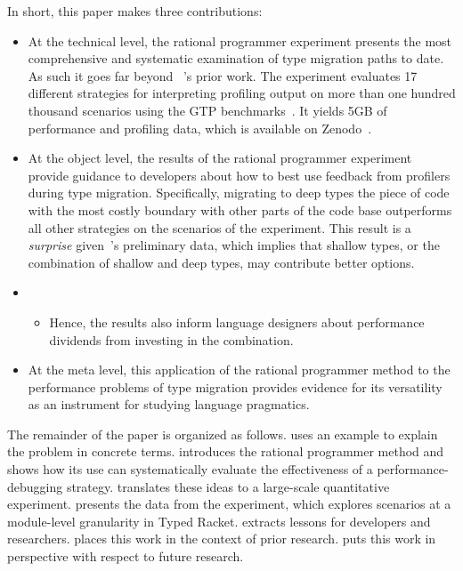 In short, this paper makes three contributions:
\begin{itemize}

\item At the technical level, the rational programmer experiment presents
  the most comprehensive and systematic examination of type migration
    paths to date.    As such it goes far beyond ~\citet{g-deep-shallow}'s 
    prior work.  The experiment evaluates 17 different strategies for
    interpreting profiling output on  more than one hundred thousand scenarios using the GTP
    benchmarks~\cite{g-rep-2023}. It yields
     5GB of performance and profiling data, which
    is available on
    Zenodo~\cite{gdf-artifact-2023}.
  
\item At the object level, the results of the rational programmer
  experiment provide guidance to developers about how to best use feedback
    from profilers during type migration. Specifically, 
    migrating to deep types the piece of code with the most costly
    boundary with other parts of the code base
    outperforms all other  strategies on the scenarios of
    the experiment. This result is a \emph{surprise} given~\citet{g-deep-shallow}'s
    preliminary data, which implies that shallow types, or the combination of shallow and deep
    types, may contribute better options.

     \item[]\begin{itemize}
      \item
         Hence, the results also inform language designers about
         performance dividends from investing in  the combination.
    \end{itemize}


\item At the meta level, this application of the rational programmer method to
 the performance problems of type migration provides evidence for its versatility
 as an instrument for studying language pragmatics.

\end{itemize}
The remainder of the paper is organized as follows.  
uses an example to explain the problem in concrete terms. 
introduces the rational programmer method and shows how its use can systematically
evaluate the effectiveness of a performance-debugging strategy.
 translates these ideas to a
large-scale quantitative experiment.
 presents the data from the experiment, which
explores scenarios at a module-level granularity in Typed Racket.
 extracts lessons for developers and researchers.
 places this work in the context of prior research.
 puts this work in perspective with respect to future
research.
